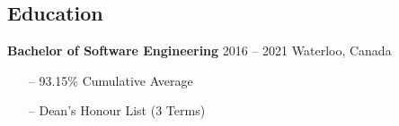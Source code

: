 \documentclass{resume}
\begin{document}
\begin{sidebar}
    \section{Education}\vspace{-0.2cm}
      \color{tagText}\textbf{Bachelor of Software Engineering}
      \color{tagText}2016 -- 2021 \separator\color{tagText}Waterloo, Canada
      \color{bodyText}%
      \begin{itemize}[leftmargin=0.45cm, noitemsep, topsep=0.0cm]%
        \item[--] 93.15\% Cumulative Average
        \item[--] Dean's Honour List (3 Terms)
      \end{itemize}%
  \end{sidebar}
  \begin{main}
    \vspace{0.2cm}%

\end{main}
\end{document}

